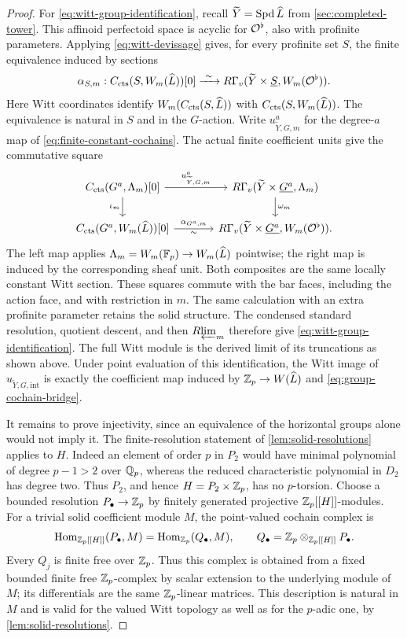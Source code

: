 \begin{proof}
For \eqref{eq:witt-group-identification}, recall
$\widetilde Y=\operatorname{Spd}\widehat L$ from \cref{sec:completed-tower}.
This affinoid perfectoid space is acyclic for $\mathcal O^\flat$, also with
profinite parameters.  Applying \eqref{eq:witt-devissage} gives, for
every profinite set $S$, the finite equivalence induced by sections
\[
 \alpha_{S,m}:C_{\mathrm{cts}}(S,W_m(\widehat L))[0]
       \xrightarrow{\ \sim\ }
 R\Gamma_v(\widetilde Y\times\underline S,W_m(\mathcal O^\flat)).
\]
Here Witt coordinates identify $W_m(C_{\mathrm{cts}}(S,\widehat L))$ with
$C_{\mathrm{cts}}(S,W_m(\widehat L))$.  The equivalence is natural in $S$
and in the $G$-action.  Write $u^a_{\widetilde Y,G,m}$ for the
degree-$a$ map of \eqref{eq:finite-constant-cochains}.  The actual
finite coefficient units give the commutative square
\begin{equation}\label{eq:finite-witt-constant-square}
\begin{tikzcd}[column sep=large]
 C_{\cts}(G^a,\Lambda_m)[0]
    \arrow[r,"u^a_{\widetilde Y,G,m}"] \arrow[d,"\iota_m"']
   &R\Gamma_v(\widetilde Y\times\underline{G^a},\Lambda_m)
       \arrow[d,"\omega_m"]\\
 C_{\cts}(G^a,W_m(\widehat L))[0]
    \arrow[r,"\alpha_{G^a,m}","\sim"']
   &R\Gamma_v(\widetilde Y\times\underline{G^a},W_m(\cO^\flat)).
\end{tikzcd}
\end{equation}
The left map applies $\Lambda_m=W_m(\mathbb F_p)\to W_m(\widehat L)$
pointwise; the right map is induced by the corresponding sheaf unit.
Both composites are the same locally constant Witt section.  These
squares commute with the bar faces, including the action face, and
with restriction in $m$.  The same calculation with an extra
profinite parameter retains the solid structure.  The condensed
standard resolution, quotient descent, and then $R\!\varprojlim_m$ therefore
give \eqref{eq:witt-group-identification}.  The full Witt module is
the derived limit of its truncations as shown above.  Under point
evaluation of this identification, the Witt image of
$u_{\widetilde Y,G,\mathrm{int}}$ is exactly the coefficient map
induced by $\mathbb Z_p\to W(\widehat L)$ and
\eqref{eq:group-cochain-bridge}.

It remains to prove injectivity, since an equivalence of the horizontal
groups alone would not imply it.  The finite-resolution statement of
\cref{lem:solid-resolutions} applies to $H$.  Indeed an element of
order $p$ in $P_2$ would have minimal polynomial of degree $p-1>2$
over $\mathbb Q_p$, whereas the reduced characteristic polynomial in $D_2$
has degree two.  Thus $P_2$, and hence $H=P_2\times\mathbb Z_p$, has no
$p$-torsion.
Choose a bounded resolution $P_\bullet\to\mathbb Z_p$ by finitely generated
projective $\mathbb Z_p[[H]]$-modules.  For a trivial solid coefficient module
$M$, the point-valued cochain complex is
\[
 \operatorname{Hom}_{\mathbb Z_p[[H]]}(P_\bullet,M)
   =\operatorname{Hom}_{\mathbb Z_p}(Q_\bullet,M),
 \qquad
 Q_\bullet=\mathbb Z_p\otimes_{\mathbb Z_p[[H]]}P_\bullet.
\]
Every $Q_j$ is finite free over $\mathbb Z_p$.  Thus this complex is obtained
from a fixed bounded finite free $\mathbb Z_p$-complex by scalar extension
to the underlying module of $M$; its differentials are the same
$\mathbb Z_p$-linear matrices.  This description is natural in $M$ and is
valid for the valued Witt topology as well as for the $p$-adic one,
by \cref{lem:solid-resolutions}.


\end{proof}
